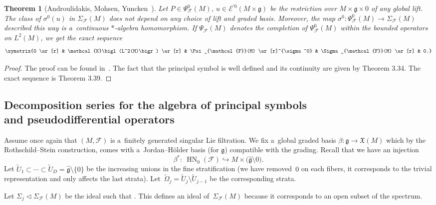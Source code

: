 \documentclass[pdftex]{sigma}
\newcommand{\R}{\mathbb R} %
\newcommand{\F}{\mathcal{F}} %
\newcommand{\g}{\mathfrak{g}} %
\newcommand{\HN}{\operatorname{HN}} %
\newcommand{\Fb}{\mathcal{F}} %
\numberwithin{equation}{section}
\newtheorem{thm}{Theorem}[section]
\theoremstyle{definition}
\begin{document}
\begin{thm}[Androulidakis, Mohsen, Yuncken~\cite{AMYMaximalHypoellipticity}] \label{Theorem: AMY key result}
Let $P \in \Psi^0_{\Fb}(M)$, $u \in \mathcal{E}^{'0}(M\times \g)$ be the restriction over $M\times \g \times 0$ of any global lift. The class of $\sigma^0(u)$ in $\Sigma_{\Fb}(M)$ does not depend on any choice of lift and graded basis. Moreover, the map $\sigma^0 \colon \Psi^0_{\Fb}(M) \to \Sigma_{\Fb}(M)$ described this way is a~continuous $*$-algebra homomorphism. If $\Psi_{\Fb}(M)$ denotes the completion of $\Psi^0_{\Fb}(M)$ within the bounded operators on $L^2(M)$, we get the exact sequence
\[\xymatrix{0 \ar[r] & \mathcal{K}\bigl(L^2(M)\bigr) \ar[r] & \Psi_{\Fb}(M) \ar[r]^{\sigma^0} & \Sigma_{\Fb}(M) \ar[r] & 0.}\]
\end{thm}

\begin{proof}
 The proof can be found in~\cite{AMYMaximalHypoellipticity}. The fact that the principal symbol is well defined and its continuity are given by Theorem 3.34. The exact sequence is Theorem 3.39.
\end{proof}

\subsection[Decomposition series for the algebra of principal symbols and pseudodifferential operators]{Decomposition series for the algebra of principal symbols\\ and pseudodifferential operators}

Assume once again that $(M,\F)$ is a~finitely generated singular Lie filtration. We fix a~global graded basis $\beta\colon\g\to \mathfrak{X}(M)$ which by the Rothschild--Stein construction, comes with a~Jordan--H\"older basis (for $\g$) compatible with the grading. Recall that we have an injection
\[\beta^* \colon\ \HN_0(\F) \hookrightarrow M \times\bigl(\widehat{\g}\setminus 0\bigr).\]
Let $\widetilde{U}_1\subset \cdots\subset \widetilde{U}_D = \widehat{\g}\setminus\{0\}$ be the increasing unions in the fine stratification (we have removed~$0$ on each fibers, it corresponds to the trivial representation and only affects the last strata). Let~${\widetilde{\Omega}_j = \widetilde{U}_j \setminus \widetilde{U}_{j-1}}$ be the corresponding strata.

Let $\Sigma_j \triangleleft\Sigma_{\Fb}(M)$ be the ideal such that
\smash{$\widehat{\Sigma_j} = \bigl(\beta^*\bigr)^{-1}\bigl( M\times {\widetilde{U}_j}/{\R^*_+}\bigr)$}.
This defines an ideal of~$\Sigma_{\Fb}(M)$ because it corresponds to an open subset of the spectrum.
\end{document}
